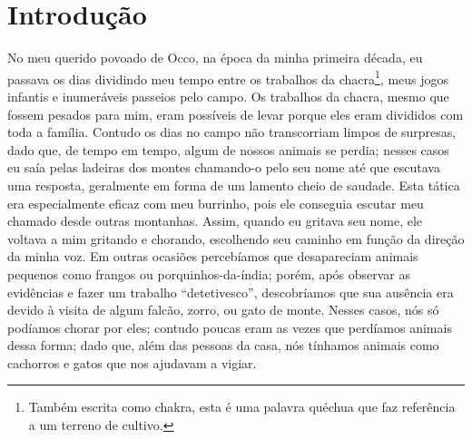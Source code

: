 \cleardoublepage
\newpage
\ifdefined\EnableIncludeImages
\fi
\chapter*{Introdução} %

No meu querido povoado de Occo, na época da minha primeira década, eu passava os dias dividindo meu tempo entre os trabalhos da chacra\footnote{Também escrita como chakra, esta é uma palavra quéchua que faz referência a um terreno de cultivo.}, meus jogos infantis e inumeráveis passeios pelo campo.
Os trabalhos da chacra, mesmo que fossem pesados para mim, eram possíveis de levar porque eles eram divididos com toda a família.
Contudo os dias no campo não transcorriam limpos de surpresas, dado que, de tempo em tempo, algum de nossos animais se perdia; nesses casos eu saía pelas ladeiras dos montes chamando-o pelo seu nome até que escutava uma resposta, geralmente em forma de um lamento cheio de saudade.
Esta tática era especialmente eficaz com meu burrinho, pois ele conseguia escutar meu chamado desde outras montanhas. Assim, quando eu gritava seu nome, ele voltava a mim gritando e chorando, escolhendo seu caminho em função da direção da minha voz.
Em outras ocasiões percebíamos que desapareciam animais pequenos como frangos ou porquinhos-da-índia; porém, após observar as evidências e fazer um trabalho ``detetivesco'', descobríamos que sua ausência era devido à visita de algum falcão, zorro, ou gato de monte.
Nesses casos, nós só podíamos chorar por eles; contudo poucas eram as vezes que perdíamos animais dessa forma; dado que, além das pessoas da casa, nós tínhamos animais como cachorros e gatos que nos ajudavam a vigiar.

